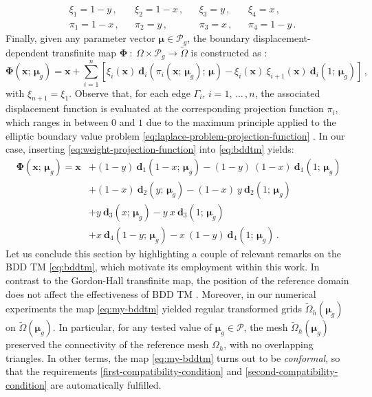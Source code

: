 \documentclass[12pt, a4paper, twoside, openright, notitlepage]{report}
\numberwithin{equation}{chapter}
\theoremstyle{theorem}
\theoremstyle{definition}
\theoremstyle{remark}
\theoremstyle{proposition}
\numberwithin{figure}{chapter}
\newcommand{\wt}[1]{\widetilde{#1}}
\newcommand{\bg}[1]{\boldsymbol{#1}}
\begin{document}
		\begin{equation}
			\label{eq:weight-projection-function}
			\begin{aligned}
				& \xi_1 = 1 - y \, , && \xi_2 = 1 - x \, , && \xi_3 = y \, , && \xi_4 = x \, , \\
				& \pi_1 = 1 - x \, , && \pi_2 = y \, , && \pi_3 = x \, , && \pi_4 = 1 - y \, .
			\end{aligned}
		\end{equation}
		Finally, given any parameter vector $\bg{\mu} \in \mathcal{P}_g$, the boundary displacement-dependent transfinite map $\bg{\Phi} ~ : ~ \Omega \times \mathcal{P}_g \rightarrow \wt{\Omega}$ is constructed as \cite{JIR14}:
		\begin{equation}
			\label{eq:bddtm}
			\bg{\Phi}(\bg{x}; \, \bg{\mu}_g) = \bg{x} + \sum_{i = 1}^{n} \left[ \xi_i(\bg{x}) ~ \bg{d}_i(\pi_i(\bg{x}; \, \bg{\mu}_g); \, \bg{\mu}) - \xi_i(\bg{x}) ~ \xi_{i+1}(\bg{x}) ~ \bg{d}_i(1; \, \bg{\mu}_g) \right] \, ,
		\end{equation}  
		with $\xi_{n+1} = \xi_1$. Observe that, for each edge $\Gamma_i$, $i = 1, \, \ldots \, , n$, the associated displacement function is evaluated at the corresponding projection function $\pi_i$, which ranges in between $0$ and $1$ due to the maximum principle applied to the elliptic boundary value problem \eqref{eq:laplace-problem-projection-function} \cite{Rud64}. In our case, inserting \eqref{eq:weight-projection-function} into \eqref{eq:bddtm} yields:
		\begin{equation}
			\label{eq:my-bddtm}
			\begin{aligned}
				\bg{\Phi}(\bg{x}; \, \bg{\mu}_g) = \bg{x} & + (1-y) ~ \bg{d}_1(1-x; \, \bg{\mu}_g) - (1-y) ~ (1-x) ~ \bg{d}_1(1; \, \bg{\mu}_g) \\
				& + (1-x) ~ \bg{d}_2(y; \, \bg{\mu}_g) - (1-x) ~ y ~ \bg{d}_2(1; \, \bg{\mu}_g) \\
				& + y ~ \bg{d}_3(x; \, \bg{\mu}_g) - y ~ x ~ \bg{d}_3(1; \, \bg{\mu}_g) \\
				& + x ~ \bg{d}_4(1-y; \, \bg{\mu}_g) - x ~ (1-y) ~ \bg{d}_4(1; \, \bg{\mu}_g) \, .
			\end{aligned}
		\end{equation}
		Let us conclude this section by highlighting a couple of relevant remarks on the BDD TM \eqref{eq:bddtm}, which motivate its employment within this work. In contrast to the Gordon-Hall transfinite map, the position of the reference domain does not affect the effectiveness of BDD TM \cite{JIR14}. Moreover, in our numerical experiments the map \eqref{eq:my-bddtm} yielded regular transformed grids $\wt{\Omega}_h(\bg{\mu}_g)$ on $\wt{\Omega}(\bg{\mu}_g)$. In particular, for any tested value of $\bg{\mu}_g \in \mathcal{P}$, the mesh $\wt{\Omega}_h(\bg{\mu}_g)$ preserved the connectivity of the reference mesh $\Omega_h$, with no overlapping triangles. In other terms, the map \eqref{eq:my-bddtm} turns out to be \emph{conformal}, so that the requirements \ref{first-compatibility-condition} and \ref{second-compatibility-condition} are automatically fulfilled. 
		
\end{document}
